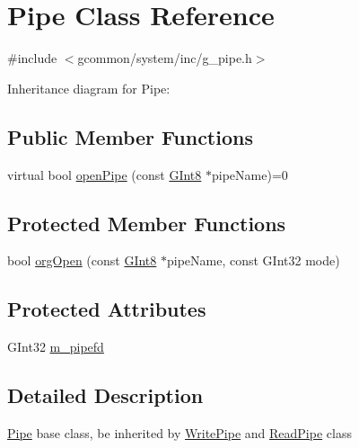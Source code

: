 \hypertarget{class_pipe}{\section{Pipe Class Reference}
\label{class_pipe}
}


{\ttfamily \#include $<$gcommon/system/inc/g\-\_\-pipe.\-h$>$}



Inheritance diagram for Pipe\-:
\subsection*{Public Member Functions}
\begin{DoxyCompactItemize}
\item 
virtual bool \hyperlink{class_pipe_a6e20309a4e8ecc7317dd5f8e1bd320cb}{open\-Pipe} (const \hyperlink{g__type_8h_ad1732c0e4cf5d108f232e44a1179e8b0}{G\-Int8} $\ast$pipe\-Name)=0
\end{DoxyCompactItemize}
\subsection*{Protected Member Functions}
\begin{DoxyCompactItemize}
\item 
bool \hyperlink{class_pipe_a3b48beaaa23ac6c9a852d1b9eb2f82b7}{org\-Open} (const \hyperlink{g__type_8h_ad1732c0e4cf5d108f232e44a1179e8b0}{G\-Int8} $\ast$pipe\-Name, const G\-Int32 mode)
\end{DoxyCompactItemize}
\subsection*{Protected Attributes}
\begin{DoxyCompactItemize}
\item 
G\-Int32 \hyperlink{class_pipe_a7776259caf82021e2ac6e1de6a14941b}{m\-\_\-pipefd}
\end{DoxyCompactItemize}


\subsection{Detailed Description}
\hyperlink{class_pipe}{Pipe} base class, be inherited by \hyperlink{class_write_pipe}{Write\-Pipe} and \hyperlink{class_read_pipe}{Read\-Pipe} class 

